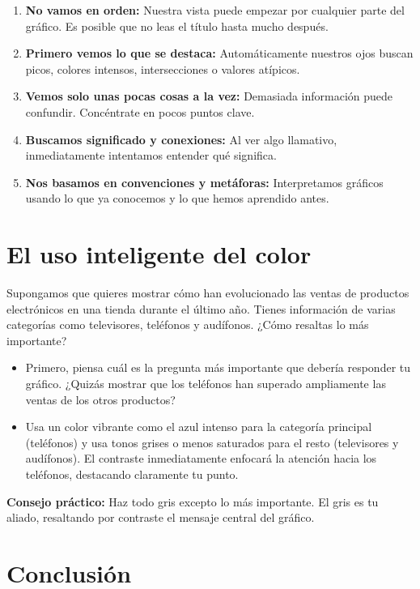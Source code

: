 \documentclass[
  spanish,
  letterpaper,
  DIV=11,
  numbers=noendperiod]{scrreprt}
\providecommand{\tightlist}{%
  \setlength{\itemsep}{0pt}\setlength{\parskip}{0pt}}
\begin{document}
\begin{enumerate}
\def\labelenumi{\arabic{enumi}.}
\tightlist
\item
  \textbf{No vamos en orden:} Nuestra vista puede empezar por cualquier
  parte del gráfico. Es posible que no leas el título hasta mucho
  después.
\item
  \textbf{Primero vemos lo que se destaca:} Automáticamente nuestros
  ojos buscan picos, colores intensos, intersecciones o valores
  atípicos.
\item
  \textbf{Vemos solo unas pocas cosas a la vez:} Demasiada información
  puede confundir. Concéntrate en pocos puntos clave.
\item
  \textbf{Buscamos significado y conexiones:} Al ver algo llamativo,
  inmediatamente intentamos entender qué significa.
\item
  \textbf{Nos basamos en convenciones y metáforas:} Interpretamos
  gráficos usando lo que ya conocemos y lo que hemos aprendido antes.
\end{enumerate}

\section{El uso inteligente del
color}\label{el-uso-inteligente-del-color}

Supongamos que quieres mostrar cómo han evolucionado las ventas de
productos electrónicos en una tienda durante el último año. Tienes
información de varias categorías como televisores, teléfonos y
audífonos. ¿Cómo resaltas lo más importante?

\begin{itemize}
\item
  Primero, piensa cuál es la pregunta más importante que debería
  responder tu gráfico. ¿Quizás mostrar que los teléfonos han superado
  ampliamente las ventas de los otros productos?
\item
  Usa un color vibrante como el azul intenso para la categoría principal
  (teléfonos) y usa tonos grises o menos saturados para el resto
  (televisores y audífonos). El contraste inmediatamente enfocará la
  atención hacia los teléfonos, destacando claramente tu punto.
\end{itemize}

\textbf{Consejo práctico:} Haz todo gris excepto lo más importante. El
gris es tu aliado, resaltando por contraste el mensaje central del
gráfico.

\section{Conclusión}\label{conclusiuxf3n}
\end{document}
